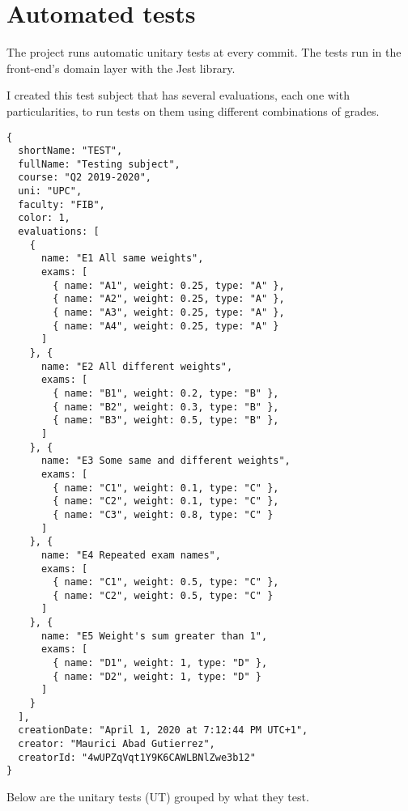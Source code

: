 \clearpage\newpage
\section{Automated tests}

The project runs automatic unitary tests at every commit. The tests run in the front-end's domain layer with the Jest library.

I created this test subject that has several evaluations, each one with particularities, to run tests on them using different combinations of grades.

\begin{verbatim}
{
  shortName: "TEST",
  fullName: "Testing subject",
  course: "Q2 2019-2020",
  uni: "UPC",
  faculty: "FIB",
  color: 1,
  evaluations: [
    {
      name: "E1 All same weights",
      exams: [
        { name: "A1", weight: 0.25, type: "A" },
        { name: "A2", weight: 0.25, type: "A" },
        { name: "A3", weight: 0.25, type: "A" },
        { name: "A4", weight: 0.25, type: "A" }
      ]
    }, {
      name: "E2 All different weights",
      exams: [
        { name: "B1", weight: 0.2, type: "B" },
        { name: "B2", weight: 0.3, type: "B" },
        { name: "B3", weight: 0.5, type: "B" },
      ]
    }, {
      name: "E3 Some same and different weights",
      exams: [
        { name: "C1", weight: 0.1, type: "C" },
        { name: "C2", weight: 0.1, type: "C" },
        { name: "C3", weight: 0.8, type: "C" }
      ]
    }, {
      name: "E4 Repeated exam names",
      exams: [
        { name: "C1", weight: 0.5, type: "C" },
        { name: "C2", weight: 0.5, type: "C" }
      ]
    }, {
      name: "E5 Weight's sum greater than 1",
      exams: [
        { name: "D1", weight: 1, type: "D" },
        { name: "D2", weight: 1, type: "D" }
      ]
    }
  ],
  creationDate: "April 1, 2020 at 7:12:44 PM UTC+1",
  creator: "Maurici Abad Gutierrez",
  creatorId: "4wUPZqVqt1Y9K6CAWLBNlZwe3b12"
}
\end{verbatim}

\clearpage\newpage\noindent
Below are the unitary tests (UT) grouped by what they test.

